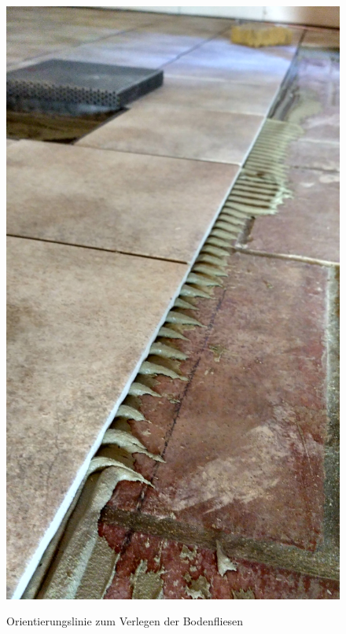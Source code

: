 \begin{figure}[h]
	\begin{center}
		\noindent\includegraphics[scale=0.1]{Resources/Praktikum/IMG_20180807_112239_HDR.jpg}
		\label{orientierung}
		\caption{Orientierungslinie zum Verlegen der Bodenfliesen}	
	\end{center}
\end{figure}

